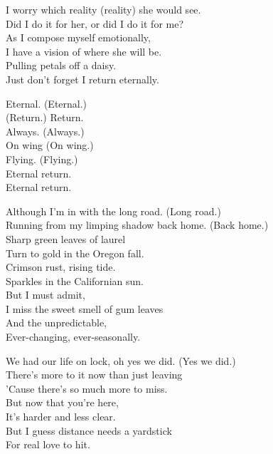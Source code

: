 I worry which reality (reality) she would see. \\
Did I do it for her, or did I do it for me? \\
As I compose myself emotionally, \\
I have a vision of where she will be. \\
Pulling petals off a daisy. \\
Just don't forget I return eternally. \\


Eternal. (Eternal.) \\
(Return.) Return. \\
Always. (Always.) \\
On wing (On wing.) \\
Flying. (Flying.) \\
Eternal return. \\
Eternal return. \\


Although I'm in  with the long road. (Long road.) \\
Running from my limping shadow back home. (Back home.) \\
Sharp green leaves of laurel \\
Turn to gold in the Oregon fall. \\
Crimson rust, rising tide. \\
Sparkles in the Californian sun. \\
But I must admit, \\
I miss the sweet smell of gum leaves \\
And the unpredictable, \\
Ever-changing, ever-seasonally. \\


We had our life on lock, oh yes we did. (Yes we did.) \\
There's more to it now than just leaving \\
'Cause there's so much more to miss. \\
But now that you're here, \\
It's harder and less clear. \\
But I guess distance needs a yardstick \\
For real love to hit. \\

